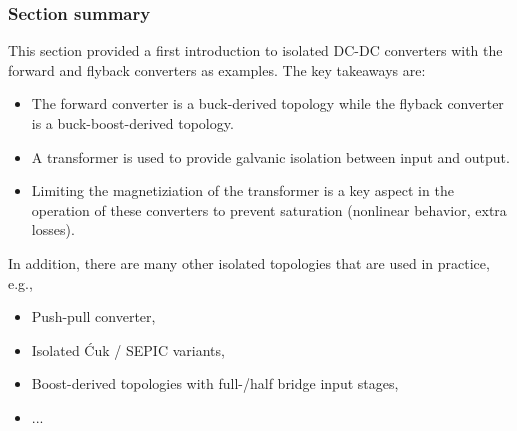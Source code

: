 \begin{frame}
    \frametitle{Section summary}
    This section provided a first introduction to isolated DC-DC converters with the forward and flyback converters as examples. The key takeaways are:
    \begin{itemize}
        \item The forward converter is a buck-derived topology while the flyback converter is a buck-boost-derived topology.
        \item A transformer is used to provide galvanic isolation between input and output.
        \item Limiting the magnetiziation of the transformer is a key aspect in the operation of these converters to prevent saturation (nonlinear behavior, extra losses).
    \end{itemize}
    In addition, there are many other isolated topologies that are used in practice, e.g., 
    \begin{itemize}
        \item Push-pull converter,
        \item Isolated Ćuk / SEPIC variants, 
        \item Boost-derived topologies with full-/half bridge input stages,
        \item ...
    \end{itemize}
\end{frame}